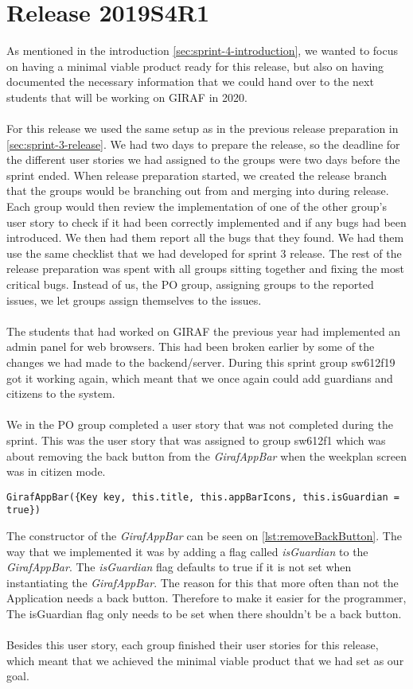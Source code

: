 \section{Release 2019S4R1}
As mentioned in the introduction \autoref{sec:sprint-4-introduction}, we wanted to focus on having a minimal viable product ready for this release, but also on having documented the necessary information that we could hand over to the next students that will be working on GIRAF in 2020.
\\\\
For this release we used the same setup as in the previous release preparation in \autoref{sec:sprint-3-release}. 
We had two days to prepare the release, so the deadline for the different user stories we had assigned to the groups were two days before the sprint ended. When release preparation started, we created the release branch that the groups would be branching out from and merging into during release. Each group would then review the implementation of one of the other group's user story to check if it had been correctly implemented and if any bugs had been introduced. We then had them report all the bugs that they found. We had them use the same checklist that we had developed for sprint 3 release. The rest of the release preparation was spent with all groups sitting together and fixing the most critical bugs. Instead of us, the PO group, assigning groups to the reported issues, we let groups assign themselves to the issues.
\\\\
The students that had worked on GIRAF the previous year had implemented an admin panel for web browsers. This had been broken earlier by some of the changes we had made to the backend/server. During this sprint group sw612f19 got it working again, which meant that we once again could add guardians and citizens to the system.
\\\\
We in the PO group completed a user story that was not completed during the sprint. This was the user story that was assigned to group sw612f1 which was about removing the back button from the \textit{GirafAppBar} when the weekplan screen was in citizen mode.
\begin{lstlisting}[caption={Removing back button from the citizens screen},label={lst:removeBackButton},language={[Sharp]C}]
    GirafAppBar({Key key, this.title, this.appBarIcons, this.isGuardian = true})
\end{lstlisting}
The constructor of the \textit{GirafAppBar} can be seen on \autoref{lst:removeBackButton}. 
The way that we implemented it was by adding a flag called \textit{isGuardian} to the \textit{GirafAppBar}. 
The \textit{isGuardian} flag defaults to true if it is not set when instantiating the \textit{GirafAppBar}. The reason for this that more often than not the Application needs a back button. Therefore to make it easier for the programmer, The isGuardian flag only needs to be set when there shouldn't be a back button.
\\\\
Besides this user story, each group finished their user stories for this release, which meant that we achieved the minimal viable product that we had set as our goal. 

